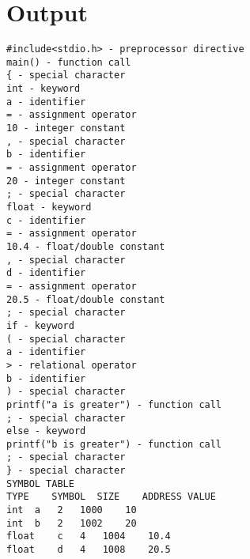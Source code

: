 \documentclass[11pt]{article}
\begin{document}
\section{Output}
\label{sec-2}
\begin{verbatim}
#include<stdio.h> - preprocessor directive
main() - function call
{ - special character
int - keyword
a - identifier
= - assignment operator
10 - integer constant
, - special character
b - identifier
= - assignment operator
20 - integer constant
; - special character
float - keyword
c - identifier
= - assignment operator
10.4 - float/double constant
, - special character
d - identifier
= - assignment operator
20.5 - float/double constant
; - special character
if - keyword
( - special character
a - identifier
> - relational operator
b - identifier
) - special character
printf("a is greater") - function call
; - special character
else - keyword
printf("b is greater") - function call
; - special character
} - special character
SYMBOL TABLE
TYPE	SYMBOL	SIZE	ADDRESS	VALUE
int	 a	 2	 1000	 10
int	 b	 2	 1002	 20
float	 c	 4	 1004	 10.4
float	 d	 4	 1008	 20.5
\end{verbatim}
\end{document}
